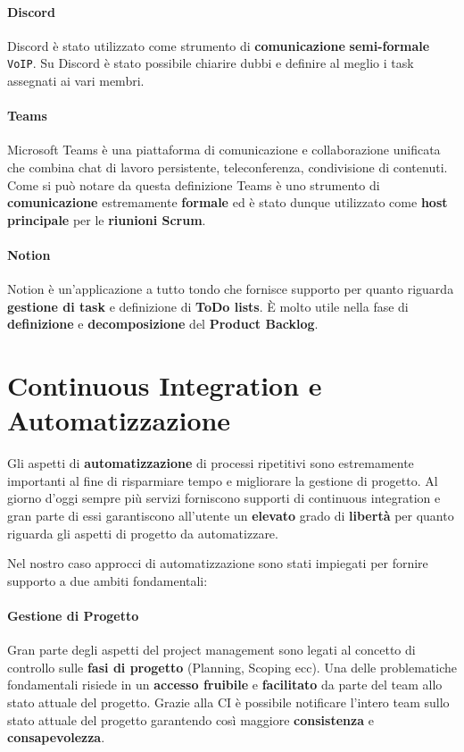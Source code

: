 \paragraph{Discord}
Discord è stato utilizzato come strumento di \textbf{comunicazione} \textbf{semi-formale} \texttt{VoIP}. Su Discord è stato possibile chiarire dubbi e definire al meglio i task assegnati ai vari membri.

\paragraph{Teams}
Microsoft Teams è una piattaforma di comunicazione e collaborazione unificata che combina chat di lavoro persistente, teleconferenza, condivisione di contenuti. Come si può notare da questa definizione Teams è uno strumento di \textbf{comunicazione} estremamente \textbf{formale} ed è stato dunque utilizzato come \textbf{host principale} per le \textbf{riunioni Scrum}.

\paragraph{Notion}
Notion è un'applicazione a tutto tondo che fornisce supporto per quanto riguarda \textbf{gestione di task} e definizione di \textbf{ToDo lists}. È molto utile nella fase di \textbf{definizione} e \textbf{decomposizione} del \textbf{Product Backlog}.

\section{Continuous Integration e Automatizzazione}
Gli aspetti di \textbf{automatizzazione} di processi ripetitivi sono estremamente importanti al fine di risparmiare tempo e migliorare la gestione di progetto. Al giorno d'oggi sempre più servizi forniscono supporti di continuous integration e gran parte di essi garantiscono all'utente un \textbf{elevato} grado di \textbf{libertà} per quanto riguarda gli aspetti di progetto da automatizzare.

Nel nostro caso approcci di automatizzazione sono stati impiegati per fornire supporto a due ambiti fondamentali:
\paragraph{Gestione di Progetto}
Gran parte degli aspetti del project management sono legati al concetto di controllo sulle \textbf{fasi di progetto} (Planning, Scoping ecc). Una delle problematiche fondamentali risiede in un \textbf{accesso fruibile} e \textbf{facilitato} da parte del team allo stato attuale del progetto. Grazie alla CI è possibile notificare l'intero team sullo stato attuale del progetto garantendo così maggiore \textbf{consistenza} e \textbf{consapevolezza}.

